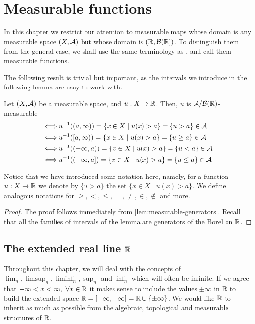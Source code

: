 
\chapter{Measurable functions}

In this chapter we restrict our attention to measurable maps whose domain is any measurable space $(X, \mathcal{A})$ but whose domain is $(\mathbb{R}, \mathcal{B}(\mathbb{R}))$. To distinguish them from the general case, we shall use the same terminology as \cite{schilling2017}, and call them measurable functions.

The following result is trivial but important, as the intervals we introduce in the following lemma are easy to work with.

\begin{lem}
	\label{lem:measurable-generators-functions}
	Let $(X, \mathcal{A})$ be a measurable space, and $u: X \to \mathbb{R}$. Then, $u$ is $\mathcal{A}/\mathcal{B}(\mathbb{R})$-measurable
	\begin{align*}
		\iff &{u}^{-1}((a, \infty)) = \{x \in X \mid u(x) > a\} = \{u > a\} \in \mathcal{A}\\
		\iff &{u}^{-1}([a, \infty)) = \{x \in X \mid u(x) > a\} = \{u \geq a\} \in \mathcal{A}\\
		\iff &{u}^{-1}((-\infty, a)) = \{x \in X \mid u(x) > a\} = \{u < a\} \in \mathcal{A}\\
		\iff &{u}^{-1}((-\infty, a]) = \{x \in X \mid u(x) > a\} = \{u \leq a\} \in \mathcal{A}\\
	\end{align*}
\end{lem}

Notice that we have introduced some notation here, namely, for a function $u : X \to \mathbb{R}$ we denote by $\{u > a\}$ the set $\{x \in X \mid u(x) > a\}$. We define analogous notations for $\geq, <, \leq, =, \neq, \in, \not\in$ and more.

\begin{proof}
	The proof follows immediately from \autoref{lem:measurable-generators}. Recall that all the families of intervals of the lemma are generators of the Borel \siga on $\mathbb{R}$.
\end{proof}

\section{The extended real line ${\overline{\mathbb{R}}}$}

Throughout this chapter, we will deal with the concepts of $\lim_n, \limsup_n, \liminf_n, \sup_n$ and $\inf_n$ which will often be infinite. If we agree that $-\infty < x < \infty,\ \forall x \in \mathbb{R}$ it makes sense to include the values $\pm \infty$ in $\mathbb{R}$ to build the extended space ${\overline{\mathbb{R}}} = [-\infty, +\infty] = \mathbb{R} \cup \{\pm \infty\}$. We would like ${\overline{\mathbb{R}}}$ to inherit as much as possible from the algebraic, topological and measurable structures of $\mathbb{R}$.


